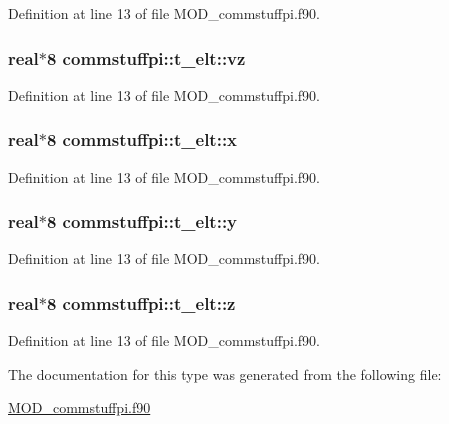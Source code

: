 Definition at line 13 of file M\-O\-D\-\_\-commstuffpi.\-f90.

\hypertarget{structcommstuffpi_1_1t__elt_a01a290f6f9c6d8220904d44b2376e7cd}{
\subsubsection[{vz}]{\setlength{\rightskip}{0pt plus 5cm}real$\ast$8 commstuffpi\-::t\-\_\-elt\-::vz}}\label{structcommstuffpi_1_1t__elt_a01a290f6f9c6d8220904d44b2376e7cd}


Definition at line 13 of file M\-O\-D\-\_\-commstuffpi.\-f90.

\hypertarget{structcommstuffpi_1_1t__elt_a7627598a90642e382cb3dbb171ad2e3f}{
\subsubsection[{x}]{\setlength{\rightskip}{0pt plus 5cm}real$\ast$8 commstuffpi\-::t\-\_\-elt\-::x}}\label{structcommstuffpi_1_1t__elt_a7627598a90642e382cb3dbb171ad2e3f}


Definition at line 13 of file M\-O\-D\-\_\-commstuffpi.\-f90.

\hypertarget{structcommstuffpi_1_1t__elt_ae972f0b43913b25386b9be4ed3ffcdd2}{
\subsubsection[{y}]{\setlength{\rightskip}{0pt plus 5cm}real$\ast$8 commstuffpi\-::t\-\_\-elt\-::y}}\label{structcommstuffpi_1_1t__elt_ae972f0b43913b25386b9be4ed3ffcdd2}


Definition at line 13 of file M\-O\-D\-\_\-commstuffpi.\-f90.

\hypertarget{structcommstuffpi_1_1t__elt_a46dd7cde4e37ed151ca268e9e9ad2d8b}{
\subsubsection[{z}]{\setlength{\rightskip}{0pt plus 5cm}real$\ast$8 commstuffpi\-::t\-\_\-elt\-::z}}\label{structcommstuffpi_1_1t__elt_a46dd7cde4e37ed151ca268e9e9ad2d8b}


Definition at line 13 of file M\-O\-D\-\_\-commstuffpi.\-f90.



The documentation for this type was generated from the following file\-:\begin{DoxyCompactItemize}
\item 
\hyperlink{MOD__commstuffpi_8f90}{M\-O\-D\-\_\-commstuffpi.\-f90}\end{DoxyCompactItemize}
